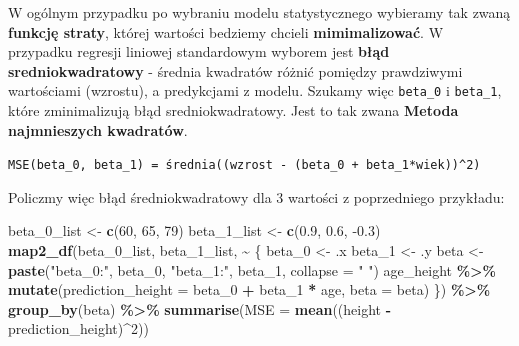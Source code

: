 \documentclass[
]{article}
\newenvironment{Shaded}{\begin{snugshade}}{\end{snugshade}}
\newcommand{\DataTypeTok}[1]{\textcolor[rgb]{0.13,0.29,0.53}{#1}}
\newcommand{\DecValTok}[1]{\textcolor[rgb]{0.00,0.00,0.81}{#1}}
\newcommand{\FloatTok}[1]{\textcolor[rgb]{0.00,0.00,0.81}{#1}}
\newcommand{\KeywordTok}[1]{\textcolor[rgb]{0.13,0.29,0.53}{\textbf{#1}}}
\newcommand{\NormalTok}[1]{#1}
\newcommand{\OperatorTok}[1]{\textcolor[rgb]{0.81,0.36,0.00}{\textbf{#1}}}
\newcommand{\StringTok}[1]{\textcolor[rgb]{0.31,0.60,0.02}{#1}}
\begin{document}
W ogólnym przypadku po wybraniu modelu statystycznego wybieramy tak
zwaną \textbf{funkcję straty}, której wartości bedziemy chcieli
\textbf{mimimalizować}. W przypadku regresji liniowej standardowym
wyborem jest \textbf{błąd sredniokwadratowy} - średnia kwadratów różnić
pomiędzy prawdziwymi wartościami (wzrostu), a predykcjami z modelu.
Szukamy więc \texttt{beta\_0} i \texttt{beta\_1}, które zminimalizują
błąd sredniokwadratowy. Jest to tak zwana \textbf{Metoda najmnieszych
kwadratów}.

\texttt{MSE(beta\_0,\ beta\_1)\ =\ średnia((wzrost\ -\ (beta\_0\ +\ beta\_1*wiek))\^{}2)}

Policzmy więc błąd średniokwadratowy dla 3 wartości z poprzedniego
przykładu:

\begin{Shaded}
\begin{Highlighting}[]
\NormalTok{beta\_}\DecValTok{0}\NormalTok{\_list \textless{}{-}}\StringTok{ }\KeywordTok{c}\NormalTok{(}\DecValTok{60}\NormalTok{, }\DecValTok{65}\NormalTok{, }\DecValTok{79}\NormalTok{)}
\NormalTok{beta\_}\DecValTok{1}\NormalTok{\_list \textless{}{-}}\StringTok{ }\KeywordTok{c}\NormalTok{(}\FloatTok{0.9}\NormalTok{, }\FloatTok{0.6}\NormalTok{, }\FloatTok{{-}0.3}\NormalTok{)}
\KeywordTok{map2\_df}\NormalTok{(beta\_}\DecValTok{0}\NormalTok{\_list, beta\_}\DecValTok{1}\NormalTok{\_list, }\OperatorTok{\textasciitilde{}}\StringTok{ }\NormalTok{\{}
\NormalTok{  beta\_}\DecValTok{0}\NormalTok{ \textless{}{-}}\StringTok{ }\NormalTok{.x}
\NormalTok{  beta\_}\DecValTok{1}\NormalTok{ \textless{}{-}}\StringTok{ }\NormalTok{.y}
\NormalTok{  beta \textless{}{-}}\StringTok{ }\KeywordTok{paste}\NormalTok{(}\StringTok{"beta\_0:"}\NormalTok{, beta\_}\DecValTok{0}\NormalTok{, }\StringTok{"beta\_1:"}\NormalTok{, beta\_}\DecValTok{1}\NormalTok{, }\DataTypeTok{collapse =} \StringTok{" "}\NormalTok{)}
\NormalTok{  age\_height }\OperatorTok{\%\textgreater{}\%}
\StringTok{    }\KeywordTok{mutate}\NormalTok{(}\DataTypeTok{prediction\_height =}\NormalTok{ beta\_}\DecValTok{0} \OperatorTok{+}\StringTok{ }\NormalTok{beta\_}\DecValTok{1} \OperatorTok{*}\StringTok{ }\NormalTok{age,}
           \DataTypeTok{beta =}\NormalTok{ beta)}
\NormalTok{\}) }\OperatorTok{\%\textgreater{}\%}
\StringTok{  }\KeywordTok{group\_by}\NormalTok{(beta) }\OperatorTok{\%\textgreater{}\%}
\StringTok{  }\KeywordTok{summarise}\NormalTok{(}\DataTypeTok{MSE =} \KeywordTok{mean}\NormalTok{((height }\OperatorTok{{-}}\StringTok{ }\NormalTok{prediction\_height)}\OperatorTok{\^{}}\DecValTok{2}\NormalTok{))}
\end{Highlighting}
\end{Shaded}
\end{document}
